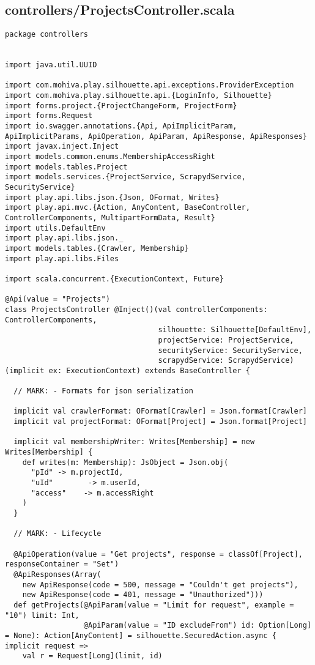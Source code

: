 \subsection{controllers/ProjectsController.scala}
\begin{lstlisting}
package controllers


import java.util.UUID

import com.mohiva.play.silhouette.api.exceptions.ProviderException
import com.mohiva.play.silhouette.api.{LoginInfo, Silhouette}
import forms.project.{ProjectChangeForm, ProjectForm}
import forms.Request
import io.swagger.annotations.{Api, ApiImplicitParam, ApiImplicitParams, ApiOperation, ApiParam, ApiResponse, ApiResponses}
import javax.inject.Inject
import models.common.enums.MembershipAccessRight
import models.tables.Project
import models.services.{ProjectService, ScrapydService, SecurityService}
import play.api.libs.json.{Json, OFormat, Writes}
import play.api.mvc.{Action, AnyContent, BaseController, ControllerComponents, MultipartFormData, Result}
import utils.DefaultEnv
import play.api.libs.json._
import models.tables.{Crawler, Membership}
import play.api.libs.Files

import scala.concurrent.{ExecutionContext, Future}

@Api(value = "Projects")
class ProjectsController @Inject()(val controllerComponents: ControllerComponents,
                                   silhouette: Silhouette[DefaultEnv],
                                   projectService: ProjectService,
                                   securityService: SecurityService,
                                   scrapydService: ScrapydService)(implicit ex: ExecutionContext) extends BaseController {

  // MARK: - Formats for json serialization

  implicit val crawlerFormat: OFormat[Crawler] = Json.format[Crawler]
  implicit val projectFormat: OFormat[Project] = Json.format[Project]

  implicit val membershipWriter: Writes[Membership] = new Writes[Membership] {
    def writes(m: Membership): JsObject = Json.obj(
      "pId" -> m.projectId,
      "uId"        -> m.userId,
      "access"    -> m.accessRight
    )
  }

  // MARK: - Lifecycle

  @ApiOperation(value = "Get projects", response = classOf[Project], responseContainer = "Set")
  @ApiResponses(Array(
    new ApiResponse(code = 500, message = "Couldn't get projects"),
    new ApiResponse(code = 401, message = "Unauthorized")))
  def getProjects(@ApiParam(value = "Limit for request", example = "10") limit: Int,
                  @ApiParam(value = "ID excludeFrom") id: Option[Long] = None): Action[AnyContent] = silhouette.SecuredAction.async { implicit request =>
    val r = Request[Long](limit, id)


\end{lstlisting}

